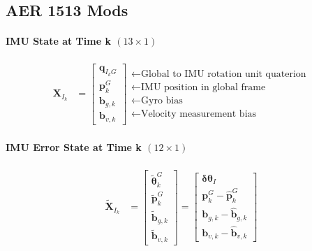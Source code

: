 \documentclass[10pt,letterpaper,fleqn,oneside]{article}
\newcommand{\nl}{\\[0.5em]}
\def\Vec#1{\mathbf{#1}} %
\newcommand{\bbm}{\begin{bmatrix}}
\newcommand{\ebm}{\end{bmatrix}}
\begin{document}
\subsection{AER 1513 Mods}
\paragraph{IMU State at Time k $(13\times1)$}
\begin{align}
\Vec{X}_{I_k} &= \bbm \Vec{q}_{I_k G} \nl
								\Vec{p}^G_k \nl
								\Vec{b}_{g,k} \nl
								\Vec{b}_{v,k}
						 \ebm 
						 \begin{array}{l}
						 \leftarrow \text{Global to IMU rotation unit quaterion} \nl
						 \leftarrow \text{IMU position in global frame} \nl
						 \leftarrow \text{Gyro bias} \nl
						 \leftarrow \text{Velocity measurement bias}
						 \end{array}						 
\end{align}

\paragraph{IMU Error State at Time k $(12\times1)$}
\begin{align}
\widetilde{\Vec{X}}_{I_k} &= 	\bbm \widetilde{\boldsymbol{\theta}}^G_k \nl
										\widetilde{\Vec{p}}^G_k \nl
										\widetilde{\Vec{b}}_{g,k} \nl
										\widetilde{\Vec{b}}_{v,k}
								\ebm
								=
								\bbm
										\boldsymbol{\delta\theta}_I \nl
										\Vec{p}^G_k - \hat{\Vec{p}}^G_k \nl
										\Vec{b}_{g,k} - \hat{\Vec{b}}_{g,k} \nl
										\Vec{b}_{v,k} - \hat{\Vec{b}}_{v,k} 
								\ebm
\end{align}
\end{document}
